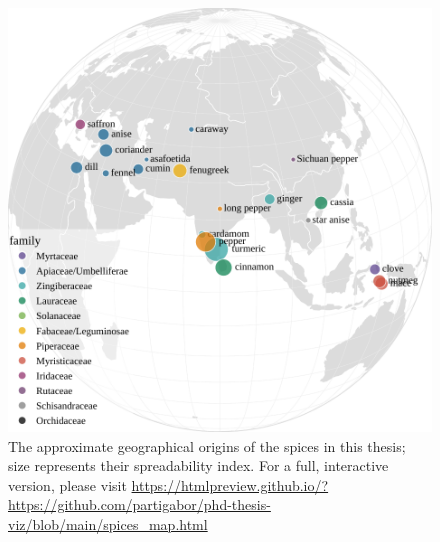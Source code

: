 \begin{figure}[ht!]
  \includegraphics[width=\linewidth]{imgs/plots/spices_map.pdf}
  \caption[The approximate geographical origins of the spices in this thesis.]{The approximate geographical origins of the spices in this thesis; size represents their spreadability index. For a full, interactive version, please visit \url{https://htmlpreview.github.io/?https://github.com/partigabor/phd-thesis-viz/blob/main/spices_map.html}}
  \label{fig:spices_map}
\end{figure}



